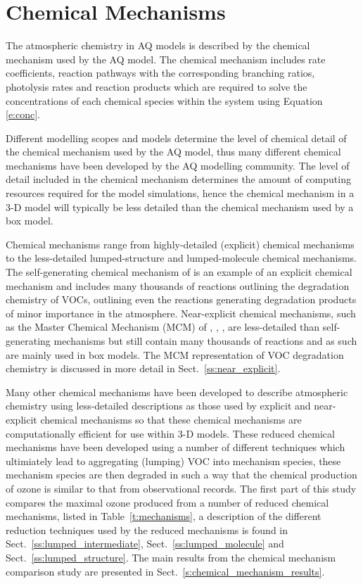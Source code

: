 \section{Chemical Mechanisms}
The atmospheric chemistry in AQ models is described by the chemical mechanism used by the AQ model. 
The chemical mechanism includes rate coefficients, reaction pathways with the corresponding branching ratios, photolysis rates and reaction products which are required to solve the concentrations of each chemical species within the system using Equation \eqref{e:conc}.

Different modelling scopes and models determine the level of chemical detail of the chemical mechanism used by the AQ model, thus many different chemical mechanisms have been developed by the AQ modelling community.
The level of detail included in the chemical mechanism determines the amount of computing resources required for the model simulations, hence the chemical mechanism in a 3-D model will typically be less detailed than the chemical mechanism used by a box model.

Chemical mechanisms range from highly-detailed (explicit) chemical mechanisms to the less-detailed lumped-structure and lumped-molecule chemical mechanisms.
The self-generating chemical mechanism of \citet{Aumont:2005} is an example of an explicit chemical mechanism and includes many thousands of reactions outlining the degradation chemistry of VOCs, outlining even the reactions generating degradation products of minor importance in the atmosphere.
Near-explicit chemical mechanisms, such as the Master Chemical Mechanism (MCM) of \citet{Jenkin:1997}, \citet{Jenkin:2003}, \citet{Saunders:2003}, are less-detailed than self-generating mechanisms but still contain many thousands of reactions and as such are mainly used in box models.
The MCM representation of VOC degradation chemistry is discussed in more detail in Sect.~\ref{ss:near_explicit}.

Many other chemical mechanisms have been developed to describe atmospheric chemistry using less-detailed descriptions as those used by explicit and near-explicit chemical mechanisms so that these chemical mechanisms are computationally efficient for use within 3-D models.
These reduced chemical mechanisms have been developed using a number of different techniques which ultimiately lead to aggregating (lumping) VOC into mechanism species, these mechanism species are then degraded in such a way that the chemical production of ozone is similar to that from observational records.
The first part of this study compares the maximal ozone produced from a number of reduced chemical mechanisms, listed in Table~\ref{t:mechanisms}, a description of the different reduction techniques used by the reduced mechanisms is found in Sect.~\ref{ss:lumped_intermediate}, Sect.~\ref{ss:lumped_molecule} and Sect.~\ref{ss:lumped_structure}.
The main results from the chemical mechanism comparison study are presented in Sect.~\ref{s:chemical_mechanism_results}.

